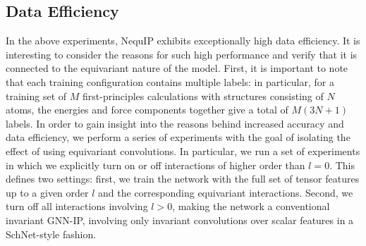 \documentclass[11pt]{article}
\begin{document}
\subsection{Data Efficiency}

In the above experiments, NequIP exhibits exceptionally high data efficiency. It is interesting to consider the reasons for such high performance and verify that it is connected to the equivariant nature of the model. First, it is important to note that each training configuration contains multiple labels: in particular, for a training set of $M$ first-principles calculations with structures consisting of $N$ atoms, the energies and force components together give a total of  $M (3N + 1)$ labels. In order to gain insight into the reasons behind increased accuracy and data efficiency, we perform a series of experiments with the goal of isolating the effect of using equivariant convolutions. In particular, we run a set of experiments in which we explicitly turn on or off interactions of higher order than $l=0$. This defines two settings: first, we train the network with the full set of tensor features up to a given order $l$ and the corresponding equivariant interactions. Second, we turn off all interactions involving $l>0$, making the network a conventional invariant GNN-IP, involving only invariant convolutions over scalar features in a SchNet-style fashion.\\
\end{document}

